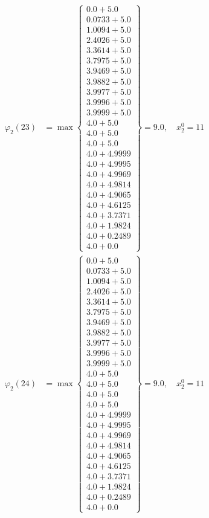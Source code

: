 \documentclass{article}
\begin{document}
\begin{align*}
  
  
  
\varphi_{2}(23) &= \max \left\{ \begin{array}{c}
0.0 + 5.0 \\
 0.0733 + 5.0 \\
 1.0094 + 5.0 \\
 2.4026 + 5.0 \\
 3.3614 + 5.0 \\
 3.7975 + 5.0 \\
 3.9469 + 5.0 \\
 3.9882 + 5.0 \\
 3.9977 + 5.0 \\
 3.9996 + 5.0 \\
 3.9999 + 5.0 \\
 4.0 + 5.0 \\
 4.0 + 5.0 \\
 4.0 + 5.0 \\
 4.0 + 4.9999 \\
 4.0 + 4.9995 \\
 4.0 + 4.9969 \\
 4.0 + 4.9814 \\
 4.0 + 4.9065 \\
 4.0 + 4.6125 \\
 4.0 + 3.7371 \\
 4.0 + 1.9824 \\
 4.0 + 0.2489 \\
 4.0 + 0.0
\end{array} \right\}=9.0,\quad x_{2}^0=11\\
  
  
  
  
\varphi_{2}(24) &= \max \left\{ \begin{array}{c}
0.0 + 5.0 \\
 0.0733 + 5.0 \\
 1.0094 + 5.0 \\
 2.4026 + 5.0 \\
 3.3614 + 5.0 \\
 3.7975 + 5.0 \\
 3.9469 + 5.0 \\
 3.9882 + 5.0 \\
 3.9977 + 5.0 \\
 3.9996 + 5.0 \\
 3.9999 + 5.0 \\
 4.0 + 5.0 \\
 4.0 + 5.0 \\
 4.0 + 5.0 \\
 4.0 + 5.0 \\
 4.0 + 4.9999 \\
 4.0 + 4.9995 \\
 4.0 + 4.9969 \\
 4.0 + 4.9814 \\
 4.0 + 4.9065 \\
 4.0 + 4.6125 \\
 4.0 + 3.7371 \\
 4.0 + 1.9824 \\
 4.0 + 0.2489 \\
 4.0 + 0.0
\end{array} \right\}=9.0,\quad x_{2}^0=11\\
  

\end{align*}
\end{document}
